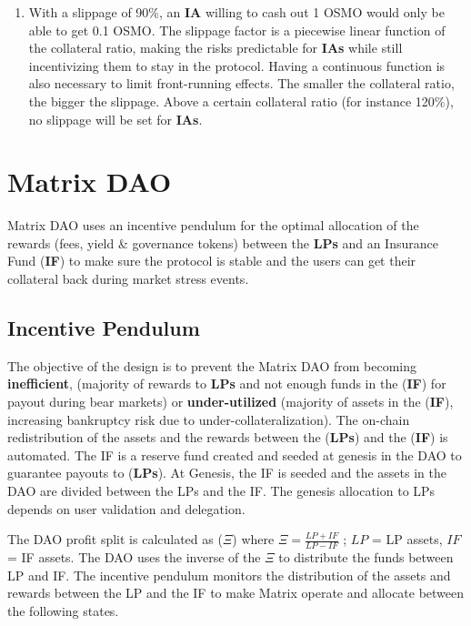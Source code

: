 \documentclass[%
 reprint,
nofootinbib,
 amsmath,amssymb,
 aps,
]{revtex4-2}
\begin{document}
\begin{enumerate}
\item 
  With a slippage of 90\%, an \textbf{IA} willing to cash out 1 OSMO would only be able to get 0.1 OSMO. The slippage factor is a piecewise linear function of the collateral ratio, making the risks predictable for \textbf{IAs} while still incentivizing them to stay in the protocol. Having a continuous function is also necessary to limit front-running effects. The smaller the collateral ratio, the bigger the slippage. Above a certain collateral ratio (for instance 120\%), no slippage will be set for \textbf{IAs}.
\end{enumerate}

\section{Matrix DAO} \label{Section4}

Matrix DAO uses an incentive pendulum for the optimal allocation of the rewards (fees, yield & governance tokens) between the \textbf{LPs} and an Insurance Fund (\textbf{IF}) to make sure the protocol is stable and the users can get their collateral back during market stress events.

\subsection{Incentive Pendulum}

The objective of the design is to prevent the Matrix DAO from becoming \textbf{inefficient}, (majority of rewards to \textbf{LPs} and not enough funds in the (\textbf{IF}) for payout during bear markets) or \textbf{under-utilized} (majority of assets in the (\textbf{IF}), increasing bankruptcy risk due to under-collateralization). The on-chain redistribution of the assets and the rewards between the (\textbf{LPs}) and the (\textbf{IF}) is automated. The IF is a reserve fund created and seeded at genesis in the DAO to guarantee payouts to (\textbf{LPs}). At Genesis, the IF is seeded and the assets in the DAO are divided between the LPs and the IF. The genesis allocation to LPs depends on user validation and delegation. 

The DAO profit split is calculated as ($\Xi$) where $\Xi = \frac{LP + IF}{LP- IF}$ ; $LP$ = LP assets, $IF$ = IF assets. The DAO uses the inverse of the $\Xi$ to distribute the funds between LP and IF. The incentive pendulum monitors the distribution of the assets and rewards between the LP and the IF to make Matrix operate and allocate between the following states. 
\end{document}
